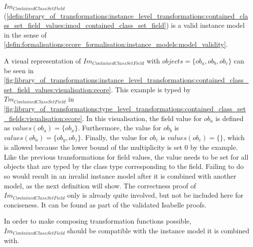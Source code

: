 \begin{thm}
\label{defin:library_of_transformations:instance_level_transformations:contained_class_set_field_values:imod_contained_class_set_field_correct}
$Im_{ContainedClassSetField}$ (\cref{defin:library_of_transformations:instance_level_transformations:contained_class_set_field_values:imod_contained_class_set_field}) is a valid instance model in the sense of \cref{defin:formalisations:ecore_formalisation:instance_models:model_validity}.
\end{thm}

A visual representation of $Im_{ContainedClassSetField}$ with $objects = \{ob_a, ob_b, ob_c\}$ can be seen in \cref{fig:library_of_transformations:instance_level_transformations:contained_class_set_field_values:visualisation:ecore}. This example is typed by $Tm_{ContainedClassSetField}$ in \cref{fig:library_of_transformations:type_level_transformations:contained_class_set_fields:visualisation:ecore}. In this visualisation, the field value for $ob_a$ is defined as $values(ob_a) = \{ob_x\}$. Furthermore, the value for $ob_b$ is $values(ob_a) = \{ob_y, ob_z\}$. Finally, the value for $ob_c$ is $values(ob_c) = \{\}$, which is allowed because the lower bound of the multiplicity is set 0 by the example. Like the previous transformations for field values, the value needs to be set for all objects that are typed by the class type corresponding to the field. Failing to do so would result in an invalid instance model after it is combined with another model, as the next definition will show. The correctness proof of $Im_{ContainedClassSetField}$ only is already quite involved, but not be included here for conciseness. It can be found as part of the validated Isabelle proofs.

In order to make composing transformation functions possible, $Im_{ContainedClassSetField}$ should be compatible with the instance model it is combined with.

